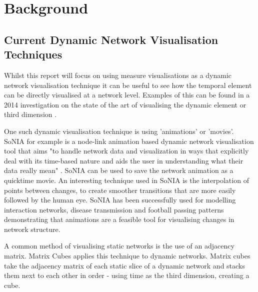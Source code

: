 
\chapter{Background}

\section{Current Dynamic Network Visualisation Techniques}

Whilst this report will focus on using measure visualisations as a dynamic network visualisation technique it can be useful to see how the temporal element can be directly visualised at a network level. Examples of this can be found in a 2014 investigation on the state of the art of visualising the dynamic element or third dimension \cite{tsotaivg}. %

One such dynamic visualisation technique is using 'animations' or 'movies'. SoNIA \cite{sonia} for example is a node-link animation based dynamic network visualisation tool that aims "to handle network data and visualization in ways that explicitly deal with its time-based nature and aids the user in understanding what their data really mean" \cite{taasodnv}. SoNIA can be used to save the network animation as a quicktime movie. An interesting technique used in SoNIA is the interpolation of points between changes, to create smoother transitions that are more easily followed by the human eye. SoNIA has been successfully used for modelling interaction networks, disease transmission and football passing patterns demonstrating that animations are a feasible tool for visualising changes in network structure.

A common method of visualising static networks is the use of an adjacency matrix. Matrix Cubes \cite{vdnwmc} applies this technique to dynamic networks. Matrix cubes take the adjacency matrix of each static slice of a dynamic network and stacks them next to each other in order - using time as the third dimension, creating a cube. 

